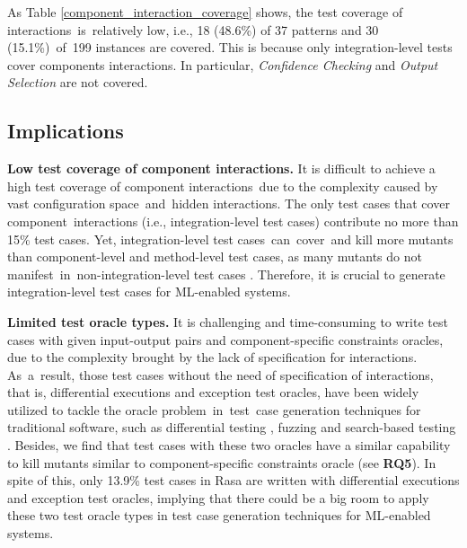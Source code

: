         As Table \ref{component_interaction_coverage} shows, the test coverage of interactions~is~relatively low, i.e., 18 (48.6\%) of 37 patterns and 30 (15.1\%)~of~199 instances are covered. This is because only integration-level tests cover components interactions.
        In particular, \textit{Confidence Checking} and \textit{Output Selection} are not covered.
        
        \subsection{Implications} 
        
        \textbf{Low test coverage of component interactions.} It is difficult to achieve a high test coverage of component interactions~due to the complexity caused by vast configuration space~and~hidden interactions. The only test cases that cover component~interactions (i.e., integration-level test cases) contribute no more than 15\% test cases.
        Yet, integration-level test cases~can~cover~and kill more mutants than component-level and method-level test cases, as many mutants do not manifest~in~non-integration-level test cases \cite{integration_test}.
        Therefore, it is crucial to generate integration-level test cases for ML-enabled systems.
        
        
        \textbf{Limited test oracle types.} 
        It is challenging and time-consuming to write test cases with given input-output pairs and component-specific constraints oracles, due to the complexity brought by the lack of specification for interactions. 
        As~a~result, those test cases without the need of specification of interactions, that is, differential executions and exception test oracles, have been widely utilized to tackle the oracle problem~in~test~case generation techniques for traditional software, such as differential testing \cite{evans2007differential}, fuzzing \cite{liang2018fuzzing} and search-based testing \cite{mcminn2011search}.
        Besides, we find that test cases with these two oracles have a similar capability to kill mutants similar to component-specific constraints oracle (see \textbf{RQ5}). In spite of this, only 13.9\% test cases in Rasa are written with differential executions and exception test oracles, implying that there could be a big room to apply these two test oracle types in test case generation techniques for ML-enabled systems.

